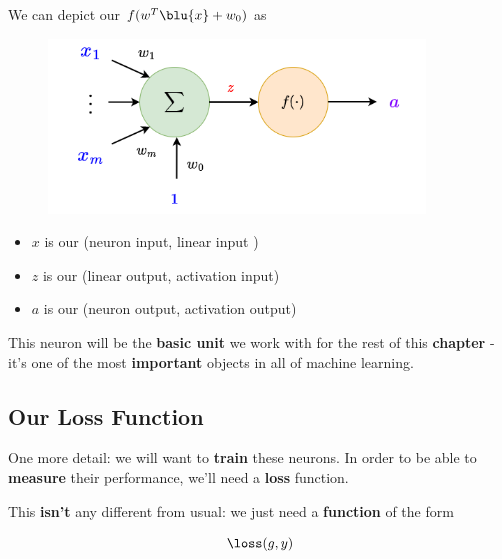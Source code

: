         \begin{notation}
            We can depict our  $f(w^T\blu{x}+w_0)$ as
            
            \begin{figure}[H]
                \centering
                \includegraphics[width=100mm,scale=0.4]{images/nn_images/full_neuron.png}
            \end{figure}
            
            \begin{itemize}
                \item $x$ is our  (neuron input, linear input )
                
                \item $z$ is our  (linear output, activation input)
                
                \item $a$ is our  (neuron output, activation output)
            \end{itemize}
        \end{notation}
    
        This neuron will be the \textbf{basic unit} we work with for the rest of this \textbf{chapter} - it's one of the most \textbf{important} objects in all of machine learning.
        
    \subsection{Our Loss Function}
    
        One more detail: we will want to \textbf{train} these neurons. In order to be able to \textbf{measure} their performance, we'll need a \textbf{loss} function.
        
        This \textbf{isn't} any different from usual: we just need a \textbf{function} of the form
        
        \begin{equation}
            \loss(g,y)
        \end{equation}
        
